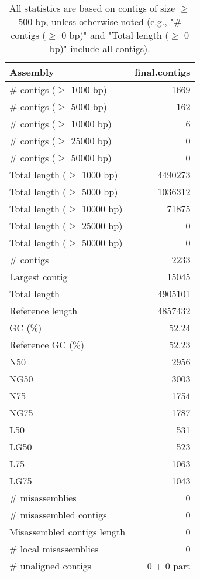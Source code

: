 \documentclass[12pt,a4paper]{article}
\begin{document}
\begin{table}[ht]
\begin{center}
\caption{All statistics are based on contigs of size $\geq$ 500 bp, unless otherwise noted (e.g., "\# contigs ($\geq$ 0 bp)" and "Total length ($\geq$ 0 bp)" include all contigs).}
\begin{tabular}{|l*{1}{|r}|}
\hline
Assembly & final.contigs \\ \hline
\# contigs ($\geq$ 1000 bp) & 1669 \\ \hline
\# contigs ($\geq$ 5000 bp) & 162 \\ \hline
\# contigs ($\geq$ 10000 bp) & 6 \\ \hline
\# contigs ($\geq$ 25000 bp) & 0 \\ \hline
\# contigs ($\geq$ 50000 bp) & 0 \\ \hline
Total length ($\geq$ 1000 bp) & 4490273 \\ \hline
Total length ($\geq$ 5000 bp) & 1036312 \\ \hline
Total length ($\geq$ 10000 bp) & 71875 \\ \hline
Total length ($\geq$ 25000 bp) & 0 \\ \hline
Total length ($\geq$ 50000 bp) & 0 \\ \hline
\# contigs & 2233 \\ \hline
Largest contig & 15045 \\ \hline
Total length & 4905101 \\ \hline
Reference length & 4857432 \\ \hline
GC (\%) & 52.24 \\ \hline
Reference GC (\%) & 52.23 \\ \hline
N50 & 2956 \\ \hline
NG50 & 3003 \\ \hline
N75 & 1754 \\ \hline
NG75 & 1787 \\ \hline
L50 & 531 \\ \hline
LG50 & 523 \\ \hline
L75 & 1063 \\ \hline
LG75 & 1043 \\ \hline
\# misassemblies & 0 \\ \hline
\# misassembled contigs & 0 \\ \hline
Misassembled contigs length & 0 \\ \hline
\# local misassemblies & 0 \\ \hline
\# unaligned contigs & 0 + 0 part \\ \hline

\end{tabular}
\end{center}
\end{table}
\end{document}
